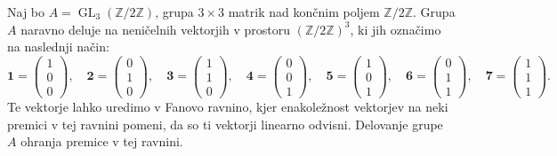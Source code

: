 \documentclass[11pt]{book}
\def\ZZ{\mathbb{Z}}
\def\one{\mathbf{1}}
\def\two{\mathbf{2}}
\def\three{\mathbf{3}}
\def\four{\mathbf{4}}
\def\five{\mathbf{5}}
\def\six{\mathbf{6}}
\def\seven{\mathbf{7}}
\DeclareMathOperator\GL{GL}
\theoremstyle{definition}
\theoremstyle{zgled}
\theoremstyle{odprtproblem}
\theoremstyle{domacanaloga}
\theoremstyle{izrek}
\begin{document}
Naj bo $A = \GL_3(\ZZ/2\ZZ)$, grupa $3 \times 3$ matrik nad končnim poljem $\ZZ/2\ZZ$. Grupa $A$ naravno deluje na neničelnih vektorjih v prostoru $(\ZZ/2\ZZ)^3$, ki jih označimo na naslednji način:
\[
\one = \begin{pmatrix} 1 \\ 0 \\ 0\end{pmatrix}, \quad 
\two = \begin{pmatrix} 0 \\ 1 \\ 0\end{pmatrix}, \quad
\three = \begin{pmatrix} 1 \\ 1 \\ 0\end{pmatrix}, \quad
\four = \begin{pmatrix} 0 \\ 0 \\ 1\end{pmatrix}, \quad 
\five = \begin{pmatrix} 1 \\ 0 \\ 1\end{pmatrix}, \quad 
\six = \begin{pmatrix} 0 \\ 1 \\ 1\end{pmatrix}, \quad 
\seven = \begin{pmatrix} 1 \\ 1 \\ 1\end{pmatrix}.
\]
Te vektorje lahko uredimo v Fanovo ravnino, kjer enakoležnost vektorjev na neki premici v tej ravnini pomeni, da so ti vektorji linearno odvisni.
Delovanje grupe $A$ ohranja premice v tej ravnini. 
\end{document}
